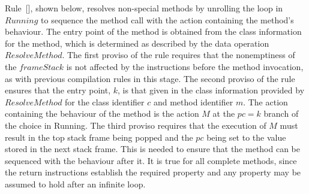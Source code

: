 Rule~[], shown below, resolves
non-special methods by unrolling the loop in $Running$ to sequence the
method call with the action containing the method's behaviour.
The entry point of the method is obtained from the class information
for the method, which is determined as described by the data operation
$ResolveMethod$.
The first proviso of the rule requires that the nonemptiness of the
$frameStack$ is not affected by the instructions before the method
invocation, as with previous compilation rules in this stage. 
The second proviso of the rule ensures that the entry point, $k$, is
that given in the class information provided by $ResolveMethod$ for
the class identifier $c$ and method identifier $m$.
The action containing the behaviour of the method is the action $M$ at
the $pc = k$ branch of the choice in Running.
The third proviso requires that the execution of $M$ must result in
the top stack frame being popped and the $pc$ being set to the value
stored in the next stack frame.
This is needed to ensure that the method can be sequenced with the
behaviour after it.
It is true for all complete methods, since the return instructions
establish the required property and any property may be assumed to
hold after an infinite loop.

